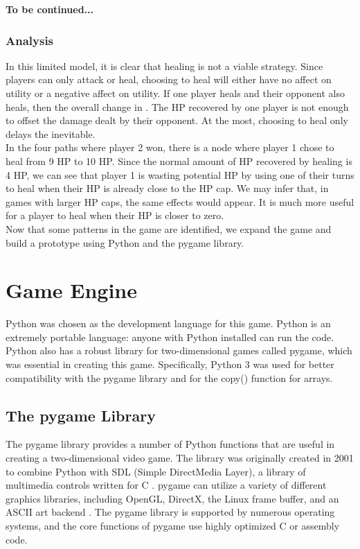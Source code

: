 \textbf{To be continued...}

\subsubsection{Analysis}
In this limited model, it is clear that healing is not a viable strategy. Since players can only attack or heal, choosing to heal will either have no affect on utility or a negative affect on utility. If one player heals and their opponent also heals, then the overall change in . The HP recovered by one player is not enough to offset the damage dealt by their opponent. At the most, choosing to heal only delays the inevitable.\\

In the four paths where player 2 won, there is a node where player 1 chose to heal from 9 HP to 10 HP. Since the normal amount of HP recovered by healing is 4 HP, we can see that player 1 is wasting potential HP by using one of their turns to heal when their HP is already close to the HP cap. We may infer that, in games with larger HP caps, the same effects would appear. It is much more useful for a player to heal when their HP is closer to zero.\\

Now that some patterns in the game are identified, we expand the game and build a prototype using Python and the pygame library.

\section{Game Engine}
Python was chosen as the development language for this game. Python is an extremely portable language: anyone with Python installed can run the code. Python also has a robust library for two-dimensional games called pygame, which was essential in creating this game. Specifically, Python 3 was used for better compatibility with the pygame library and for the copy() function for arrays.

\subsection{The pygame Library}
The pygame library provides a number of Python functions that are useful in creating a two-dimensional video game. The library was originally created in 2001 to combine Python with SDL (Simple DirectMedia Layer), a library of multimedia controls written for C \cite{shinners}. pygame can utilize a variety of different graphics libraries, including OpenGL, DirectX, the Linux frame buffer, and an ASCII art backend \cite{shinners}. The pygame library is supported by numerous operating systems, and the core functions of pygame use highly optimized C or assembly code.\\

